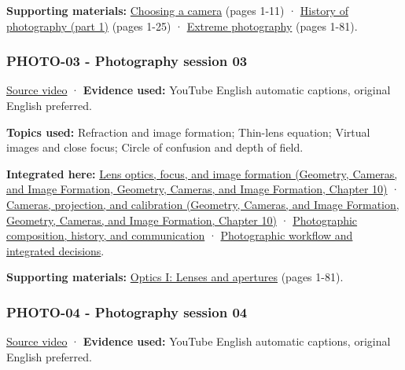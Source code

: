 \textbf{Supporting materials:} \href{https://drive.google.com/open?id=0B6w2XfPHEcZYQlF2U1VjRHRNLUE}{Choosing a camera} (pages 1-11) · \href{https://drive.google.com/open?id=0B6w2XfPHEcZYcm1nc0lRV0h4dzg}{History of photography (part 1)} (pages 1-25) · \href{https://drive.google.com/file/d/0B6w2XfPHEcZYVTZ5YzFzdXc3b0U/view?usp=sharing}{Extreme photography} (pages 1-81).

\subsubsection{PHOTO-03 - Photography session 03}\label{04-visual-computing-ii-ch036-photo-03---photography-session-03}

\href{https://www.youtube.com/watch?v=Q-hIFIHay9I}{Source video} · \textbf{Evidence used:} YouTube English automatic captions, original English preferred.

\textbf{Topics used:} Refraction and image formation; Thin-lens equation; Virtual images and close focus; Circle of confusion and depth of field.

\textbf{Integrated here:} \href{../03-Geometry-Cameras-and-Image-Formation/main.pdf\#nameddest=03-visual-computing-i-ch003-lens-optics-focus-and-image-formation}{Lens optics, focus, and image formation (Geometry, Cameras, and Image Formation, Geometry, Cameras, and Image Formation, Chapter 10)} · \href{../03-Geometry-Cameras-and-Image-Formation/main.pdf\#nameddest=03-visual-computing-i-ch003-cameras-projection-and-calibration}{Cameras, projection, and calibration (Geometry, Cameras, and Image Formation, Geometry, Cameras, and Image Formation, Chapter 10)} · \hyperref[04-visual-computing-ii-ch034-photographic-composition-history-and-communication]{Photographic composition, history, and communication} · \hyperref[04-visual-computing-ii-ch034-photographic-workflow-and-integrated-decisions]{Photographic workflow and integrated decisions}.

\textbf{Supporting materials:} \href{https://drive.google.com/file/d/0B6w2XfPHEcZYT0dwaFF4emd6Vzg/view?usp=sharing}{Optics I: Lenses and apertures} (pages 1-81).

\subsubsection{PHOTO-04 - Photography session 04}\label{04-visual-computing-ii-ch036-photo-04---photography-session-04}

\href{https://www.youtube.com/watch?v=Y6kwPir0uMM}{Source video} · \textbf{Evidence used:} YouTube English automatic captions, original English preferred.

